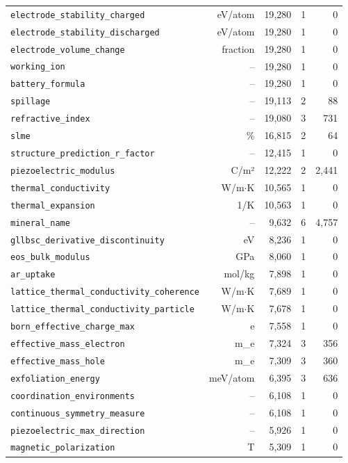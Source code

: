 \begin{longtable}{lrrrr}
\texttt{electrode\_stability\_charged} & eV/atom & 19{,}280 & 1 & 0 \\
\texttt{electrode\_stability\_discharged} & eV/atom & 19{,}280 & 1 & 0 \\
\texttt{electrode\_volume\_change} & fraction & 19{,}280 & 1 & 0 \\
\texttt{working\_ion} & -- & 19{,}280 & 1 & 0 \\
\texttt{battery\_formula} & -- & 19{,}280 & 1 & 0 \\
\texttt{spillage} & -- & 19{,}113 & 2 & 88 \\
\texttt{refractive\_index} & -- & 19{,}080 & 3 & 731 \\
\texttt{slme} & \% & 16{,}815 & 2 & 64 \\
\texttt{structure\_prediction\_r\_factor} & -- & 12{,}415 & 1 & 0 \\
\texttt{piezoelectric\_modulus} & C/m² & 12{,}222 & 2 & 2{,}441 \\
\texttt{thermal\_conductivity} & W/m$\cdot$K & 10{,}565 & 1 & 0 \\
\texttt{thermal\_expansion} & 1/K & 10{,}563 & 1 & 0 \\
\texttt{mineral\_name} & -- & 9{,}632 & 6 & 4{,}757 \\
\texttt{gllbsc\_derivative\_discontinuity} & eV & 8{,}236 & 1 & 0 \\
\texttt{eos\_bulk\_modulus} & GPa & 8{,}060 & 1 & 0 \\
\texttt{ar\_uptake} & mol/kg & 7{,}898 & 1 & 0 \\
\texttt{lattice\_thermal\_conductivity\_coherence} & W/m$\cdot$K & 7{,}689 & 1 & 0 \\
\texttt{lattice\_thermal\_conductivity\_particle} & W/m$\cdot$K & 7{,}678 & 1 & 0 \\
\texttt{born\_effective\_charge\_max} & e & 7{,}558 & 1 & 0 \\
\texttt{effective\_mass\_electron} & m\_e & 7{,}324 & 3 & 356 \\
\texttt{effective\_mass\_hole} & m\_e & 7{,}309 & 3 & 360 \\
\texttt{exfoliation\_energy} & meV/atom & 6{,}395 & 3 & 636 \\
\texttt{coordination\_environments} & -- & 6{,}108 & 1 & 0 \\
\texttt{continuous\_symmetry\_measure} & -- & 6{,}108 & 1 & 0 \\
\texttt{piezoelectric\_max\_direction} & -- & 5{,}926 & 1 & 0 \\
\texttt{magnetic\_polarization} & T & 5{,}309 & 1 & 0 \\

\end{longtable}
